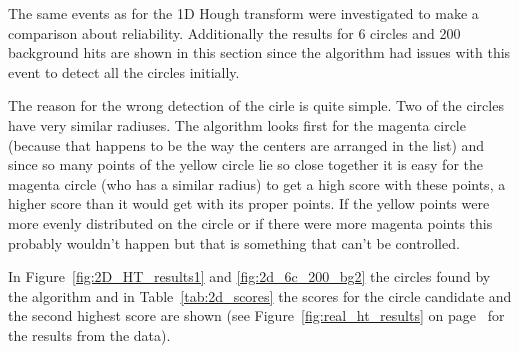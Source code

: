 \documentclass[11pt,twoside]{scrreprt}
\begin{document}
The same events as for the 1D
Hough transform were investigated to make a comparison about reliability. Additionally the results for 6 circles
and 200 background hits are shown in this section since the algorithm had issues with this event to detect
all the circles initially. 

The reason for the wrong detection of the cirle is quite simple. Two of the circles have very similar radiuses. 
The algorithm looks first for the magenta circle (because that happens to be the way the centers are arranged in the list) 
and since so many points of the yellow circle lie so close together it is easy for the magenta circle (who has a similar radius) 
to get a high score with these points, a higher score than it would get with its proper points. If the yellow points were more evenly 
distributed on the circle or if there were more magenta points this probably wouldn't happen but that is something that can't be controlled.

In Figure~\ref{fig:2D_HT_results1} and \ref{fig:2d_6c_200_bg2} the circles found by the algorithm and in Table~\ref{tab:2d_scores} the scores
for the circle candidate and the second highest score are shown (see Figure~\ref{fig:real_ht_results} on page~\pageref{fig:real_ht_results}
for the results from the data).
\end{document}
